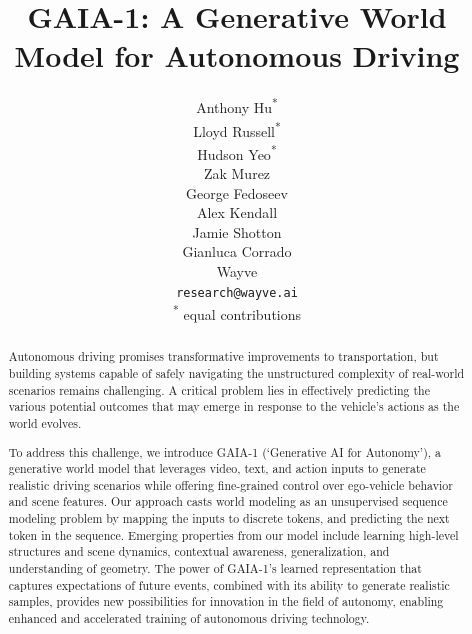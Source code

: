 \documentclass{article}
\title{GAIA-1: \linebreak A Generative World Model for  Autonomous Driving}
\author{%
  Anthony Hu\textsuperscript{*}\\
  \And
  Lloyd Russell\textsuperscript{*}\\
  \And
  Hudson Yeo\textsuperscript{*}\\
  \And
  Zak Murez\\
  \And
  George Fedoseev\\
  \And
  Alex Kendall\\
  \And
  Jamie Shotton\\
  \And
  Gianluca Corrado\\
  \AND
  Wayve\\
  \texttt{research@wayve.ai}\\
  \textsuperscript{*} equal contributions
}
\begin{document}
\graphicspath{{Figures/}}

\maketitle


\begin{abstract}
    Autonomous driving promises transformative improvements to transportation, but building systems capable of safely navigating the unstructured complexity of real-world scenarios remains challenging. A critical problem lies in effectively predicting the various potential outcomes that may emerge in response to the vehicle's actions as the world evolves.

    To address this challenge, we introduce GAIA-1 (`Generative AI for Autonomy'), a generative world model that leverages video, text, and action inputs to generate realistic driving scenarios while offering fine-grained control over ego-vehicle behavior and scene features. Our approach casts world modeling as an unsupervised sequence modeling problem by mapping the inputs to discrete tokens, and predicting the next token in the sequence. Emerging properties from our model include learning high-level structures and scene dynamics, contextual awareness, generalization, and understanding of geometry. The power of GAIA-1’s learned representation that captures expectations of future events, combined with its ability to generate realistic samples, provides new possibilities for innovation in the field of autonomy, enabling enhanced and accelerated training of autonomous driving technology.
\end{abstract}













\clearpage


%
\end{document}

